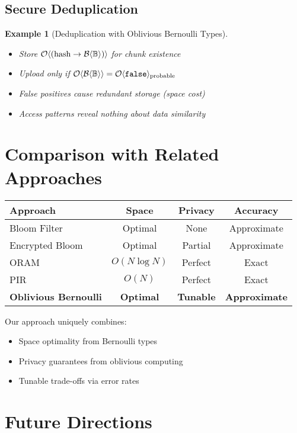 \documentclass[11pt,final,hidelinks]{article}
\newcommand{\BernBool}{\mathcal{B}\langle \Bool \rangle}
\newtheorem{example}[theorem]{Example}
\begin{document}
\subsection{Secure Deduplication}

\begin{example}[Deduplication with Oblivious Bernoulli Types]
\begin{itemize}
    \item Store $\ObvMap{\text{hash}}{\BernBool}$ for chunk existence
    \item Upload only if $\Obv{\BernBool} = \Obv{\False}_{\text{probable}}$
    \item False positives cause redundant storage (space cost)
    \item Access patterns reveal nothing about data similarity
\end{itemize}
\end{example}

\section{Comparison with Related Approaches}

\begin{center}
\begin{tabular}{lccc}
\toprule
\textbf{Approach} & \textbf{Space} & \textbf{Privacy} & \textbf{Accuracy} \\
\midrule
Bloom Filter & Optimal & None & Approximate \\
Encrypted Bloom & Optimal & Partial & Approximate \\
ORAM & $O(N \log N)$ & Perfect & Exact \\
PIR & $O(N)$ & Perfect & Exact \\
\textbf{Oblivious Bernoulli} & \textbf{Optimal} & \textbf{Tunable} & \textbf{Approximate} \\
\bottomrule
\end{tabular}
\end{center}

Our approach uniquely combines:
\begin{itemize}
    \item Space optimality from Bernoulli types
    \item Privacy guarantees from oblivious computing
    \item Tunable trade-offs via error rates
\end{itemize}

\section{Future Directions}
\end{document}
